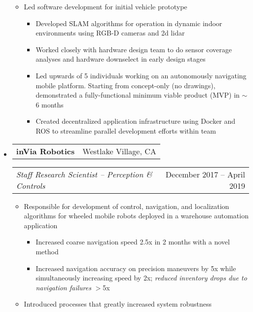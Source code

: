 \documentclass[letterpaper,18pt]{article}
\makeatletter
\newcommand{\resitem}[1]{\item #1 \vspace{-2pt}}
\newcommand{\headerrow}[2]{%
  \hspace*{-\labelsep}%
  \begin{tabular*}{\dimexpr\linewidth+\labelsep}{@{\extracolsep{\fill}}lr@{}}
    #1 &
    #2 \\
  \end{tabular*}%
}
\makeatother
\begin{document}
\begin{itemize}[label={},leftmargin=*,noitemsep]
{\begin{itemize}[noitemsep]
        \begin{itemize}[noitemsep]
                \resitem{Developed interview process for software candidates, including coding challenge component and skill set questions for computer vision, navigation, and general software candidate interviews}
                \resitem{Conducted $\sim$90\% of interviews initially, including technical panel interviews for hardware team candidates, but was able to delegate much of this responsibility as the team grew.}
                \resitem{Grew the team from 1 (me) to 12+ in 8 months.  Total team, including hardware and industrial design, grew to 35+}
        \end{itemize}
        \resitem{Led software development for initial vehicle prototype}
        \begin{itemize}[noitemsep]
                \resitem{Developed SLAM algorithms for operation in dynamic indoor environments using RGB-D cameras and 2d lidar}
                \resitem{Worked closely with hardware design team to do sensor coverage analyses and hardware downselect in early design stages}
                \resitem{Led upwards of 5 individuals working on an autonomously navigating mobile platform.  Starting from concept-only (no drawings), demonstrated a fully-functional minimum viable product (MVP) in $\sim$6 months}
		        \resitem{Created decentralized application infrastructure using Docker and ROS to streamline parallel development efforts within team}
        \end{itemize}
	\end{itemize}
	}
\item
	\headerrow{\textbf{inVia Robotics}}{Westlake Village, CA}
	\headerrow{\emph{Staff Research Scientist -- Perception \& Controls}}{December 2017 -- April 2019}
	{\small
	\begin{itemize}[noitemsep]
		\resitem{Responsible for development of control, navigation, and localization algorithms for wheeled mobile robots deployed in a warehouse automation application}
        \begin{itemize}[noitemsep]
                \resitem{Increased coarse navigation speed 2.5x in 2 months with a novel method}
                \resitem{Increased navigation accuracy on precision maneuvers by 5x while simultaneously increasing speed by 2x; \textit{reduced inventory drops due to navigation failures} $>$5x}
        \end{itemize}
		\resitem{Introduced processes that greatly increased system robustness}

\end{itemize}}
\end{itemize}
\end{document}
